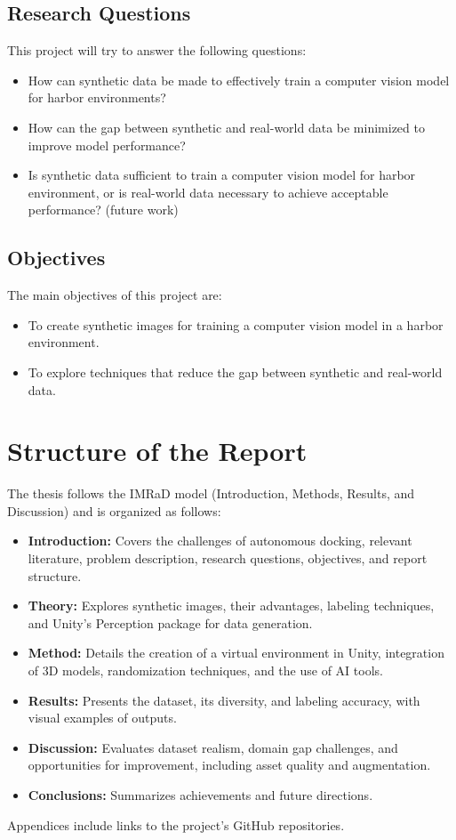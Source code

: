 \subsection{Research Questions}
This project will try to answer the following questions:
\begin{itemize}
    \item How can synthetic data be made to effectively train a computer vision model for harbor environments?
    \item How can the gap between synthetic and real-world data be minimized to improve model performance?
    \item Is synthetic data sufficient to train a computer vision model for harbor environment, or is real-world data necessary to achieve acceptable performance? (future work)
\end{itemize}

\subsection{Objectives}
The main objectives of this project are:
\begin{itemize}
    \item To create synthetic images for training a computer vision model in a harbor environment.
    \item To explore techniques that reduce the gap between synthetic and real-world data.
\end{itemize}


\section{Structure of the Report}

The thesis follows the IMRaD model (Introduction, Methods, Results, and Discussion) and is organized as follows:

\begin{itemize} 
\item \textbf{Introduction:} Covers the challenges of autonomous docking, relevant literature, problem description, research questions, objectives, and report structure. 
\item \textbf{Theory:} Explores synthetic images, their advantages, labeling techniques, and Unity's Perception package for data generation. 
\item \textbf{Method:} Details the creation of a virtual environment in Unity, integration of 3D models, randomization techniques, and the use of AI tools. 
\item \textbf{Results:} Presents the dataset, its diversity, and labeling accuracy, with visual examples of outputs. 
\item \textbf{Discussion:} Evaluates dataset realism, domain gap challenges, and opportunities for improvement, including asset quality and augmentation. 
\item \textbf{Conclusions:} Summarizes achievements and future directions.
\end{itemize}

Appendices include links to the project's GitHub repositories.

